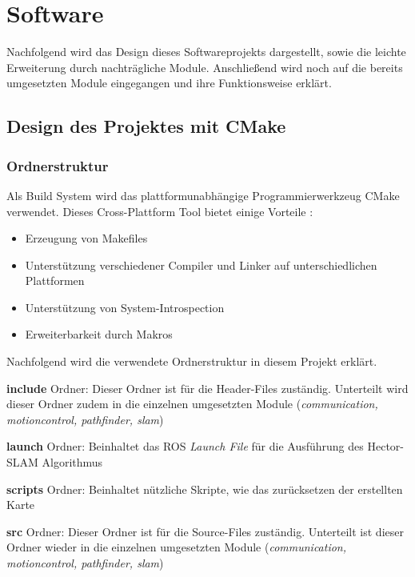 \chapter{Software}
Nachfolgend wird das Design dieses Softwareprojekts dargestellt, sowie die leichte Erweiterung durch nachträgliche Module. Anschließend wird noch auf die bereits umgesetzten Module eingegangen und ihre Funktionsweise erklärt. 






\section{Design des Projektes mit CMake}


\subsection*{Ordnerstruktur}

Als Build System wird das plattformunabhängige Programmierwerkzeug CMake verwendet. Dieses Cross-Plattform Tool bietet einige Vorteile \cite{cmake.2018}:

\begin{itemize}
\item Erzeugung von Makefiles
\item Unterstützung verschiedener Compiler und Linker auf unterschiedlichen Plattformen
\item Unterstützung von System-Introspection
\item Erweiterbarkeit durch Makros
\end{itemize} 

Nachfolgend wird die verwendete Ordnerstruktur in diesem Projekt erklärt.

\textbf{include} Ordner: Dieser Ordner ist für die Header-Files zuständig. Unterteilt wird dieser Ordner zudem in die einzelnen umgesetzten Module (\textit{communication, motioncontrol, pathfinder, slam})

\textbf{launch} Ordner: Beinhaltet das ROS \textit{Launch File} für die Ausführung des Hector-SLAM Algorithmus

\textbf{scripts} Ordner: Beinhaltet nützliche Skripte, wie das zurücksetzen der erstellten Karte

\textbf{src} Ordner: Dieser Ordner ist für die Source-Files zuständig. Unterteilt ist dieser Ordner wieder in die einzelnen umgesetzten Module (\textit{communication, motioncontrol, pathfinder, slam})

